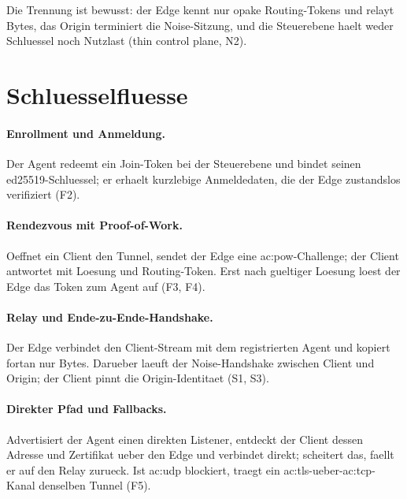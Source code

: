 Die Trennung ist bewusst: der Edge kennt nur opake Routing-Tokens und relayt
Bytes, das Origin terminiert die Noise-Sitzung, und die Steuerebene haelt weder
Schluessel noch Nutzlast (thin control plane, N2).

\section{Schluesselfluesse}
\label{sec:arch-fluesse}

\paragraph{Enrollment und Anmeldung.} Der Agent redeemt ein Join-Token bei der
Steuerebene und bindet seinen ed25519-Schluessel; er erhaelt kurzlebige
Anmeldedaten, die der Edge zustandslos verifiziert (F2).

\paragraph{Rendezvous mit Proof-of-Work.} Oeffnet ein Client den Tunnel, sendet
der Edge eine \gls{ac:pow}-Challenge; der Client antwortet mit Loesung und
Routing-Token. Erst nach gueltiger Loesung loest der Edge das Token zum Agent auf
(F3, F4).

\paragraph{Relay und Ende-zu-Ende-Handshake.} Der Edge verbindet den Client-Stream
mit dem registrierten Agent und kopiert fortan nur Bytes. Darueber laeuft der
Noise-Handshake zwischen Client und Origin; der Client pinnt die
Origin-Identitaet (S1, S3).

\paragraph{Direkter Pfad und Fallbacks.} Advertisiert der Agent einen direkten
Listener, entdeckt der Client dessen Adresse und Zertifikat ueber den Edge und
verbindet direkt; scheitert das, faellt er auf den Relay zurueck. Ist
\gls{ac:udp} blockiert, traegt ein \gls{ac:tls}-ueber-\gls{ac:tcp}-Kanal denselben
Tunnel (F5).

